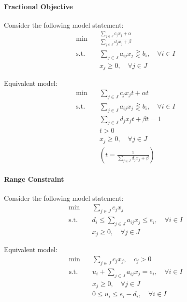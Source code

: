             \paragraph{Fractional Objective}
                
                Consider the following model statement:
                \begin{align*}
                    \min \quad & \frac{\sum_{j\in J}c_{j}x_j + \alpha}{\sum_{j\in J}d_{j}x_j + \beta} \\
                    \text{s.t.} \quad & \sum_{j\in J}a_{ij}x_j \gtreqless b_i, \quad \forall i\in I \\
                                      & x_j \ge 0, \quad \forall j\in J 
                \end{align*}
                
                Equivalent model:
                \begin{align*}
                    \min \quad & \sum_{j\in J}c_{j}x_jt + \alpha t \\
                    \text{s.t.} \quad & \sum_{j\in J}a_{ij}x_j \gtreqless b_i, \quad \forall i\in I \\
                                      & \sum_{j\in J}d_jx_jt + \beta t = 1\\
                                      & t > 0 \\
                                      & x_j \ge 0, \quad \forall j\in J \\
                                      & (t = \frac1{\sum_{j\in J}d_jx_j + \beta})
                \end{align*}
            
            \paragraph{Range Constraint}
                
                Consider the following model statement:
                \begin{align*}
                    \min \quad & \sum_{j\in J}c_jx_j \\
                    \text{s.t.} \quad & d_i\le \sum_{j\in J}a_{ij}x_j \le e_i, \quad \forall i\in I \\
                                      & x_j \ge 0, \quad \forall j\in J 
                \end{align*}
                
                Equivalent model:
                \begin{align*}
                    \min \quad & \sum_{j\in J}c_jx_j, \quad c_j > 0 \\
                    \text{s.t.} \quad & u_i + \sum_{j\in J}a_{ij}x_j = e_i, \quad \forall i\in I \\
                                      & x_j \ge 0, \quad \forall j\in J \\
                                      & 0\le u_i \le e_i-d_i, \quad \forall i\in I 
                \end{align*}

